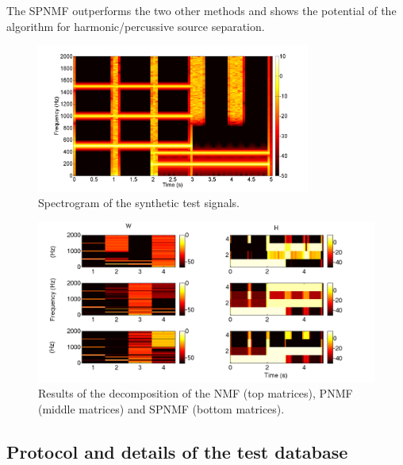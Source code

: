 \documentclass[journal]{IEEEtran}
\begin{document}
The SPNMF outperforms the two other methods and shows the potential of the algorithm for harmonic/percussive source separation.
%

\begin{figure}[htb]

  \centering 
  \includegraphics[width=9cm]{fig/synthetictestspectrogram.png}
  \caption{\label{SpectroSynth} Spectrogram of the synthetic test signals.}
  
\end{figure}

\begin{figure}
   
	\centering    
  \includegraphics[width=15cm]{fig/WHcomp.png}

\caption{\label{resultONMF2} Results of the decomposition of the NMF (top matrices), PNMF (middle matrices) and SPNMF (bottom matrices).}


\end{figure}


\subsection{Protocol and details of the test database}
\end{document}
